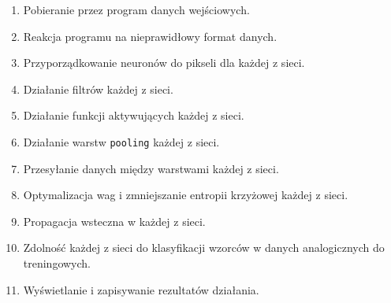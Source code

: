 \documentclass[a4paper,12pt]{article}
\begin{document}
\begin{enumerate}
\item Pobieranie przez program danych wejściowych.
\item Reakcja programu na nieprawidłowy format danych.
\item Przyporządkowanie neuronów do pikseli dla każdej z sieci.
\item Działanie filtrów każdej z sieci.
\item Działanie funkcji aktywujących każdej z sieci.
\item Działanie warstw \texttt{pooling} każdej z sieci.
\item Przesyłanie danych między warstwami każdej z sieci.
\item Optymalizacja wag i zmniejszanie entropii krzyżowej każdej z sieci.
\item Propagacja wsteczna w każdej z sieci.
\item Zdolność każdej z sieci do klasyfikacji wzorców w danych analogicznych do treningowych.
\item Wyświetlanie i zapisywanie rezultatów działania.
\end{enumerate}
\end{document}

